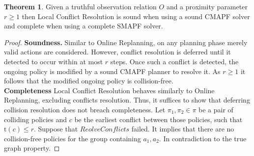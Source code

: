 \documentclass[letterpaper]{article} %
\def\
UrlFont{\rm}  %
\theoremstyle{definition}
\newtheorem{theorem}{Theorem}
\begin{document}
\begin{theorem}
   Given a truthful observation relation $O$ and a proximity parameter $r\ge1$ then Local Conflict Resolution is sound when using a sound CMAPF solver and complete when using a complete SMAPF solver.
\end{theorem}
\begin{proof}
\textbf{Soundness.} Similar to Online Replanning, on any planning phase merely valid actions are considered. However, conflict resolution is deferred until it detected to occur within at most $r$ steps.
    Once such a conflict is detected, the ongoing policy is modified by a sound CMAPF planner to resolve it. As $r\ge1$ it follows that the modified ongoing policy is collision-free.\\


\noindent \textbf{Completeness}
    Local Conflict Resolution behaves similarly to Online Replanning, excluding conflicts resolution. Thus, it suffices to show that deferring collision resolution does not breach completeness. Let $\pi_1, \pi_2 \in \pi$ be a pair of colliding policies and $c$ be the earliest conflict between those policies, such that $\mbox{t}(c) \le r$. Suppose that $ReolveConflicts$ failed. It implies that there are no collision-free policies for the group containing $a_1, a_2$. In contradiction to the true graph property.
\end{proof}



% 
\end{document}
